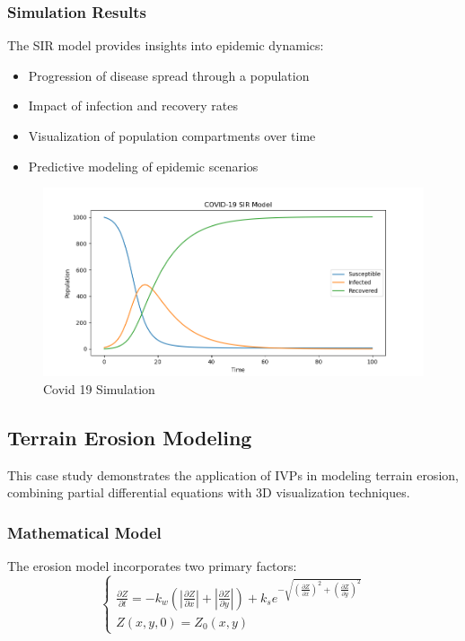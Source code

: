 \documentclass[12pt,a4paper]{article}
\begin{document}
\subsubsection{Simulation Results}
The SIR model provides insights into epidemic dynamics:
\begin{itemize}
    \item Progression of disease spread through a population
    \item Impact of infection and recovery rates
    \item Visualization of population compartments over time
    \item Predictive modeling of epidemic scenarios
\end{itemize}
\begin{figure}[H]
    \centering
    \includegraphics[width=\textwidth]{covid19.png}
    \caption{Covid 19 Simulation}
\end{figure}

\subsection{Terrain Erosion Modeling}
This case study demonstrates the application of IVPs in modeling terrain erosion, combining partial differential equations with 3D visualization techniques.

\subsubsection{Mathematical Model}
The erosion model incorporates two primary factors:
\begin{equation}
\begin{cases}
\frac{\partial Z}{\partial t} = -k_w(\left|\frac{\partial Z}{\partial x}\right| + \left|\frac{\partial Z}{\partial y}\right|) + k_s e^{-\sqrt{(\frac{\partial Z}{\partial x})^2 + (\frac{\partial Z}{\partial y})^2}} \\
Z(x,y,0) = Z_0(x,y)
\end{cases}
\end{equation}
\end{document}
